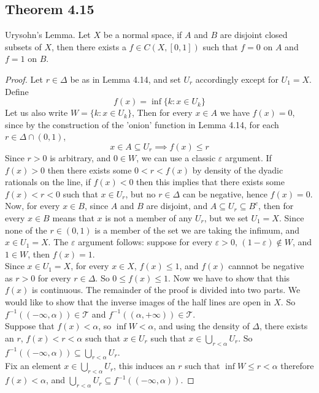 \documentclass[../../main.tex]{subfiles}
\begin{document}
\subsection{Theorem 4.15}
\begin{wts}
Urysohn's Lemma. Let $X$ be a normal space, if $A$ and $B$ are disjoint closed subsets of $X$, then there exists a $f\in C(X,[0,1])$ such that $f=0$ on $A$ and $f=1$ on $B$.
\end{wts}
\begin{proof}
Let $r\in \Delta$ be as in Lemma 4.14, and set $U_r$ accordingly except for $U_1=X$. Define 
\[
f(x) = \inf\{k:x\in U_k\}
\]
Let us also write $W=\{k:x\in U_k\}$, Then for every $x\in A$ we have $f(x)=0$, since by the construction of the 'onion' function in Lemma 4.14, for each $r\in \Delta\cap(0,1)$, 
\[
x\in A\subseteq U_r\implies f(x)\leq r
\]
Since $r>0$ is arbitrary, and $0\in W$, we can use a classic $\varepsilon$ argument. If $f(x)>0$ then there exists some $0<r<f(x)$ by density of the dyadic rationals on the line, if $f(x)<0$ then this implies that there exists some $f(x)<r<0$ such that $x\in U_r$, but no $r\in \Delta$ can be negative, hence $f(x)=0$.\\

Now, for every $x\in B$, since $A$ and $B$ are disjoint, and $A\subseteq U_r\subseteq B^c$, then for every $x\in B$ means that $x$ is not a member of any $U_r$, but we set $U_1=X$. Since none of the $r\in(0,1)$ is a member of the set we are taking the infimum, and $x\in U_1=X$. The $\varepsilon$ argument follows: suppose for every $\varepsilon>0$, $(1-\varepsilon)\notin W$, and $1\in W$, then $f(x)=1$.\\

Since $x\in U_1=X$, for every $x\in X$, $f(x)\leq 1$, and $f(x)$ cannnot be negative as $r>0$ for every $r\in \Delta$. So $0\leq f(x)\leq 1$. Now we have to show that this $f(x)$ is continuous. The remainder of the proof is divided into two parts. We would like to show that the inverse images of the half lines are open in $X$. So $f^{-1}((-\infty,\alpha))\in \mathcal{T}$ and $f^{-1}((\alpha,+\infty))\in\mathcal{T}$.\\

Suppose that $f(x)<\alpha$, so $\inf W<\alpha$, and using the density of $\Delta$, there exists an $r$, $f(x)<r<\alpha$ such that $x\in U_r$ such that $x\in \bigcup_{r<\alpha}U_r$. So $f^{-1}((-\infty,\alpha))\subseteq \bigcup_{r<\alpha}U_r$.\\

Fix an element $x\in\bigcup_{r<\alpha}U_r$, this induces an $r$ such that $\inf W\leq r<\alpha$ therefore $f(x)<\alpha$, and $\bigcup_{r<\alpha}U_r\subseteq f^{-1}((-\infty,\alpha))$.


\end{proof}
\end{document}
